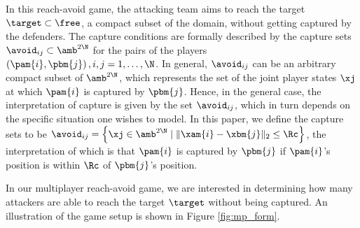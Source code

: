In this reach-avoid game, the attacking team aims to reach the target $\target\subset\free$, a compact subset of the domain, without getting captured by the defenders. 
The capture conditions are formally described by the capture sets $\avoid_{ij}\subset\amb^{2\N}$ for the pairs of the players $\left(\pam{i},\pbm{j}\right),i,j=1,\ldots,\N$. In general, $\avoid_{ij}$ can be an arbitrary compact subset of $\amb^{2\N}$, which represents the set of the joint player states $\xj$ at which $\pam{i}$ is captured by $\pbm{j}$. Hence, in the general case, the interpretation of capture is given by the set $\avoid_{ij}$, which in turn depends on the specific situation one wishes to model. In this paper, we define the capture sets to be $\avoid_{ij} = \left\{\xj\in\amb^{2\N} \mid \|\xam{i}-\xbm{j}\|_2\le\Rc \right\}$, the interpretation of which is that $\pam{i}$ is captured by $\pbm{j}$ if $\pam{i}$'s position is within $\Rc$ of $\pbm{j}$'s position. 


%

In our multiplayer reach-avoid game, we are interested in determining how many attackers are able to reach the target $\target$ without being captured. An illustration of the game setup is shown in Figure \ref{fig:mp_form}.

